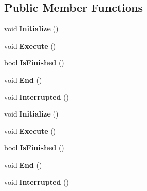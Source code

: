 \subsection*{Public Member Functions}
\begin{DoxyCompactItemize}
\item 
\hypertarget{class_mecanum_drive_a3bb39fbfc65c1ab74bcb89cee858d324}{}void {\bfseries Initialize} ()\label{class_mecanum_drive_a3bb39fbfc65c1ab74bcb89cee858d324}

\item 
\hypertarget{class_mecanum_drive_aa36e8c7458c2187dbe0a9996c9faf71a}{}void {\bfseries Execute} ()\label{class_mecanum_drive_aa36e8c7458c2187dbe0a9996c9faf71a}

\item 
\hypertarget{class_mecanum_drive_a0da7dc004a592c49fe09eb4fc0e5cb26}{}bool {\bfseries Is\+Finished} ()\label{class_mecanum_drive_a0da7dc004a592c49fe09eb4fc0e5cb26}

\item 
\hypertarget{class_mecanum_drive_a50daee6870028ab2ec3f32ef4b3328be}{}void {\bfseries End} ()\label{class_mecanum_drive_a50daee6870028ab2ec3f32ef4b3328be}

\item 
\hypertarget{class_mecanum_drive_a2739d27b3ac9936bdd9277a9eddb6bd1}{}void {\bfseries Interrupted} ()\label{class_mecanum_drive_a2739d27b3ac9936bdd9277a9eddb6bd1}

\item 
\hypertarget{class_mecanum_drive_a3bb39fbfc65c1ab74bcb89cee858d324}{}void {\bfseries Initialize} ()\label{class_mecanum_drive_a3bb39fbfc65c1ab74bcb89cee858d324}

\item 
\hypertarget{class_mecanum_drive_aa36e8c7458c2187dbe0a9996c9faf71a}{}void {\bfseries Execute} ()\label{class_mecanum_drive_aa36e8c7458c2187dbe0a9996c9faf71a}

\item 
\hypertarget{class_mecanum_drive_a0da7dc004a592c49fe09eb4fc0e5cb26}{}bool {\bfseries Is\+Finished} ()\label{class_mecanum_drive_a0da7dc004a592c49fe09eb4fc0e5cb26}

\item 
\hypertarget{class_mecanum_drive_a50daee6870028ab2ec3f32ef4b3328be}{}void {\bfseries End} ()\label{class_mecanum_drive_a50daee6870028ab2ec3f32ef4b3328be}

\item 
\hypertarget{class_mecanum_drive_a2739d27b3ac9936bdd9277a9eddb6bd1}{}void {\bfseries Interrupted} ()\label{class_mecanum_drive_a2739d27b3ac9936bdd9277a9eddb6bd1}

\end{DoxyCompactItemize}
